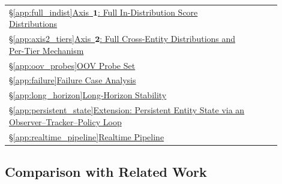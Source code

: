 {\begin{tabular}{@{}p{0.90\linewidth}r@{}}
  \hyperref[app:full_indist]{\S\ref*{app:full_indist}\enspace Axis~$\mathbf{1}$: Full In-Distribution Score Distributions}                   & \pageref{app:full_indist}     \\[2pt]
  \hyperref[app:axis2_tiers]{\S\ref*{app:axis2_tiers}\enspace Axis~$\mathbf{2}$: Full Cross-Entity Distributions and Per-Tier Mechanism}     & \pageref{app:axis2_tiers}     \\[2pt]
  \hyperref[app:oov_probes]{\S\ref*{app:oov_probes}\enspace OOV Probe Set}                                                                  & \pageref{app:oov_probes}      \\[2pt]
  \hyperref[app:failure]{\S\ref*{app:failure}\enspace Failure Case Analysis}                                                                 & \pageref{app:failure}         \\[2pt]
  \hyperref[app:long_horizon]{\S\ref*{app:long_horizon}\enspace Long-Horizon Stability}                                                      & \pageref{app:long_horizon}    \\[2pt]
    \hyperref[app:persistent_state]{\S\ref*{app:persistent_state}\enspace Extension: Persistent Entity State via an Observer--Tracker--Policy Loop} & \pageref{app:persistent_state}\\[2pt]
  \hyperref[app:realtime_pipeline]{\S\ref*{app:realtime_pipeline}\enspace Realtime Pipeline} & \pageref{app:realtime_pipeline}\\
\end{tabular}}\par\vspace{4pt}

\subsection{Comparison with Related Work}
\label{app:related_work}

